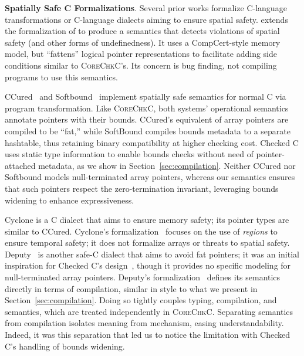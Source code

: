 \documentclass[conference]{IEEEtran}
\newcommand{\myparagraph}[1]{\textbf{#1}.\xspace}
\newcommand{\lang}{\textsc{CoreChkC}\xspace}
\begin{document}
\myparagraph{Spatially Safe C Formalizations}
Several prior works formalize C-language transformations or C-language
dialects aiming to ensure spatial safety. 
\citet{10.1145/2813885.2737979} extends the formalization
of \citet{ellison-rosu-2012-popl} to produce a semantics that detects
violations of spatial safety (and other forms of undefinedness). It
uses a CompCert-style memory model, but ``fattens'' logical pointer
representations to facilitate adding side conditions similar to \lang's.
Its concern is bug finding, not compiling programs to
use this semantics.

CCured~\cite{Necula2005} and Softbound~\cite{softbound} implement
spatially safe semantics for normal C via program transformation. Like
\lang, both systems' operational semantics annotate pointers with
their bounds. CCured's equivalent of array pointers are compiled to be
``fat,'' while SoftBound compiles bounds metadata to a separate
hashtable, thus retaining binary compatibility at higher checking
cost. Checked C uses static type information to enable bounds checks
without need of pointer-attached metadata, as we show in
Section~\ref{sec:compilation}. Neither CCured nor Softbound models
null-terminated array pointers, whereas our semantics ensures that
such pointers respect the zero-termination invariant, leveraging
bounds widening to enhance expressiveness.

Cyclone \cite{Jim2002,GrossmanMJHWC02} is a C dialect that aims to
ensure memory safety; its pointer types are similar to
CCured. Cyclone's formalization~\cite{GrossmanMJHWC02} focuses on the
use of \emph{regions} to ensure temporal safety; it does not formalize
arrays or threats to spatial safety. Deputy~\cite{Feng2006,Condit2007}
is another safe-C dialect that aims to avoid fat pointers; it was an
initial inspiration for Checked C's design~\cite{Elliott2018}, though
it provides no specific modeling for null-terminated array
pointers. Deputy's formalization~\cite{Condit2007} defines its
semantics directly in terms of compilation, similar in style to what
we present in Section~\ref{sec:compilation}. Doing so tightly couples
typing, compilation, and semantics, which are treated independently in
\lang. Separating semantics from compilation isolates meaning 
from mechanism, easing understandability. Indeed, it was this
separation that led us to notice the 
limitation with Checked C's handling of bounds widening.
\end{document}
